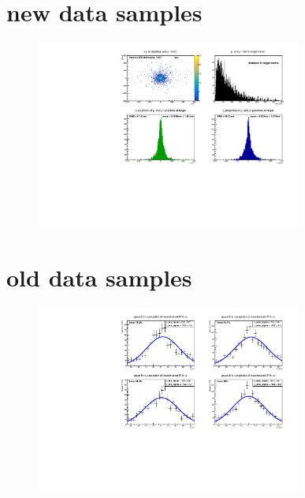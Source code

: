 \section{new data samples}

\begin{frame}[t]{}
  \begin{figure}
    \centering
    \includegraphics[width=0.78\textwidth]{../hists/nofield/new/target_dist.pdf}
  \end{figure}
\end{frame}

\section{old data samples}

\begin{frame}[t]{}
  \begin{figure}
    \centering
    \includegraphics[width=0.78\textwidth]{../hists/nofield/old/gauss_fit.pdf}
  \end{figure}
\end{frame}

